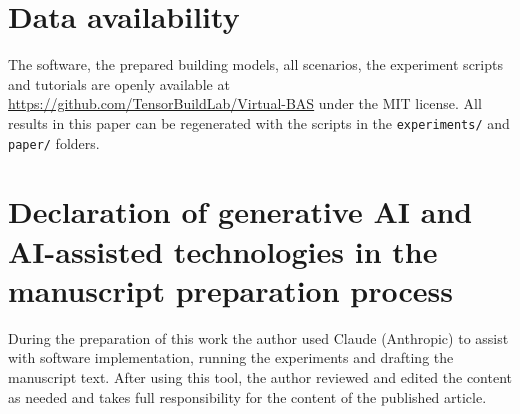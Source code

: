 \documentclass[preprint,12pt,authoryear=false]{elsarticle}
\begin{document}
\section*{Data availability}
The software, the prepared building models, all scenarios, the experiment scripts and tutorials are openly available
at \url{https://github.com/TensorBuildLab/Virtual-BAS} under the MIT license. All results in this paper can be
regenerated with the scripts in the \texttt{experiments/} and \texttt{paper/} folders.

\section*{Declaration of generative AI and AI-assisted technologies in the manuscript preparation process}
During the preparation of this work the author used Claude (Anthropic) to assist with software implementation,
running the experiments and drafting the manuscript text. After using this tool, the author reviewed and edited the
content as needed and takes full responsibility for the content of the published article.



\end{document}
